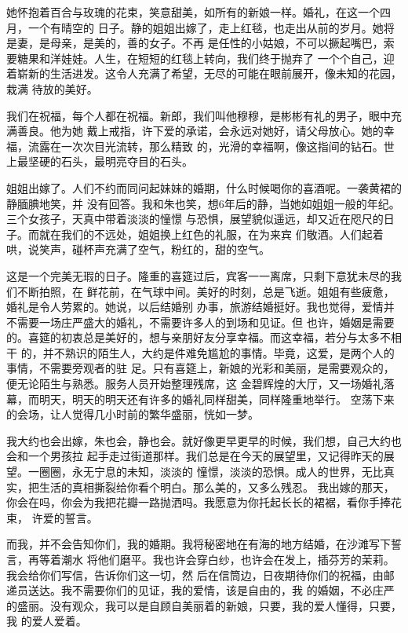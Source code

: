 		她怀抱着百合与玫瑰的花束，笑意甜美，如所有的新娘一样。婚礼，在这一个四月，一个有晴空的
	日子。静的姐姐出嫁了，走上红毯，也走出从前的岁月。她将是妻，是母亲，是美的，善的女子。不再
	是任性的小姑娘，不可以撅起嘴巴，索要糖果和洋娃娃。人生，在短短的红毯上转向，我们终于抛弃了
	一个个自己，迎着崭新的生活进发。这令人充满了希望，无尽的可能在眼前展开，像未知的花园，栽满
	待放的美好。

		我们在祝福，每个人都在祝福。新郎，我们叫他穆穆，是彬彬有礼的男子，眼中充满善良。他为她
	戴上戒指，许下爱的承诺，会永远对她好，请父母放心。她的幸福，流露在一次次目光流转，那么精致
	的，光滑的幸福啊，像这指间的钻石。世上最坚硬的石头，最明亮夺目的石头。

		姐姐出嫁了。人们不约而同问起妹妹的婚期，什么时候喝你的喜酒呢。一袭黄裙的静腼腆地笑，并
	没有回答。我和朱也笑，想6年后的静，当她如姐姐一般的年纪。三个女孩子，天真中带着淡淡的憧憬
	与恐惧，展望貌似遥远，却又近在咫尺的日子。而就在我们的不远处，姐姐换上红色的礼服，在为来宾
	们敬酒。人们起着哄，说笑声，碰杯声充满了空气，粉红的，甜的空气。

		这是一个完美无瑕的日子。隆重的喜筵过后，宾客一一离席，只剩下意犹未尽的我们不断拍照，在
	鲜花前，在气球中间。美好的时刻，总是飞逝。姐姐有些疲惫，婚礼是令人劳累的。她说，以后结婚别
	办事，旅游结婚挺好。我也觉得，爱情并不需要一场庄严盛大的婚礼，不需要许多人的到场和见证。但
	也许，婚姻是需要的。喜筵的初衷总是美好的，想与亲朋好友分享幸福。而这幸福，若分与太多不相干
	的，并不熟识的陌生人，大约是件难免尴尬的事情。毕竟，这爱，是两个人的事情，不需要旁观者的驻
	足。只有喜筵上，新娘的光彩和美丽，是需要观众的，便无论陌生与熟悉。服务人员开始整理残席，这
	金碧辉煌的大厅，又一场婚礼落幕，而明天，明天的明天还有许多的婚礼同样甜美，同样隆重地举行。
	空荡下来的会场，让人觉得几小时前的繁华盛丽，恍如一梦。

		我大约也会出嫁，朱也会，静也会。就好像更早更早的时候，我们想，自己大约也会和一个男孩拉
	起手走过街道那样。我们总是在今天的展望里，又记得昨天的展望。一圈圈，永无宁息的未知，淡淡的
	憧憬，淡淡的恐惧。成人的世界，无比真实，把生活的真相撕裂给你看个明白。那么美的，又多么残忍。
	我出嫁的那天，你会在吗，你会为我把花瓣一路抛洒吗。我愿意为你托起长长的裙裾，看你手捧花束，
	许爱的誓言。

		而我，并不会告知你们，我的婚期。我将秘密地在有海的地方结婚，在沙滩写下誓言，再等着潮水
	将他们磨平。我也许会穿白纱，也许会在发上，插芬芳的茉莉。我会给你们写信，告诉你们这一切，然
	后在信筒边，日夜期待你们的祝福，由邮递员送达。我不需要你们的见证，我的爱情，该是自由的，我
	的婚姻，不必庄严的盛丽。没有观众，我可以是自顾自美丽着的新娘，只要，我的爱人懂得，只要，我
	的爱人爱着。

